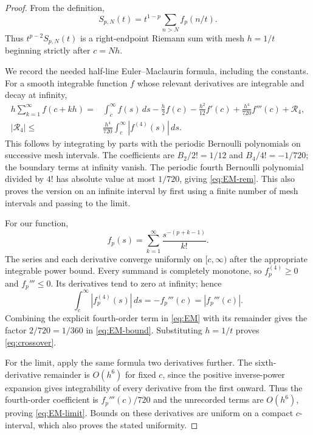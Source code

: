 \documentclass[11pt,a4paper]{article}
\numberwithin{equation}{section}
\theoremstyle{definition}
\theoremstyle{remark}
\begin{document}
\begin{proof}
From the definition,
\[
 S_{p,N}(t)=t^{1-p}\sum_{n>N} f_p(n/t).
\]
Thus $t^{p-2}S_{p,N}(t)$ is a right-endpoint Riemann sum with mesh
$h=1/t$ beginning strictly after $c=Nh$.

We record the needed half-line Euler--Maclaurin formula, including the
constants. For a smooth integrable function $f$ whose relevant derivatives are
integrable and decay at infinity,
\begin{align}
 h\sum_{k=1}^{\infty}f(c+kh)
   ={}&\int_c^\infty f(s)\,ds-\frac h2f(c)
      -\frac{h^2}{12}f'(c)+\frac{h^4}{720}f'''(c)
      +\mathcal R_4,                                         \label{eq:EM}\\
 |\mathcal R_4|\leq{}&\frac{h^4}{720}
                          \int_c^\infty|f^{(4)}(s)|\,ds.     \label{eq:EM-rem}
\end{align}
This follows by integrating by parts with the periodic Bernoulli
polynomials on successive mesh intervals. The coefficients are
$B_2/2!=1/12$ and $B_4/4!=-1/720$; the boundary terms at infinity vanish.
The periodic fourth Bernoulli polynomial divided by $4!$ has absolute
value at most $1/720$, giving \eqref{eq:EM-rem}. This also proves the
version on an infinite interval by first using a finite number of mesh
intervals and passing to the limit.

For our function,
\begin{equation}\label{eq:complete-monotone}
 f_p(s)=\sum_{k=1}^{\infty}\frac{s^{-(p+k-1)}}{k!}.
\end{equation}
The series and each derivative converge uniformly on $[c,\infty)$ after
the appropriate integrable power bound. Every summand is completely
monotone, so $f_p^{(4)}\geq0$ and $f_p'''\leq0$. Its derivatives tend
to zero at infinity; hence
\[
 \int_c^\infty|f_p^{(4)}(s)|\,ds=-f_p'''(c)=|f_p'''(c)|.
\]
Combining the explicit fourth-order term in \eqref{eq:EM} with its
remainder gives the factor $2/720=1/360$ in \eqref{eq:EM-bound}.
Substituting $h=1/t$ proves \eqref{eq:crossover}.

For the limit, apply the same formula two derivatives further. The
sixth-derivative remainder is $O(h^6)$ for fixed $c$, since the positive
inverse-power expansion gives integrability of every derivative from the
first onward. Thus the fourth-order coefficient is
$f_p'''(c)/720$ and the unrecorded terms are $O(h^6)$, proving
\eqref{eq:EM-limit}. Bounds on these derivatives are uniform on a compact
$c$-interval, which also proves the stated uniformity.
\end{proof}
\end{document}
